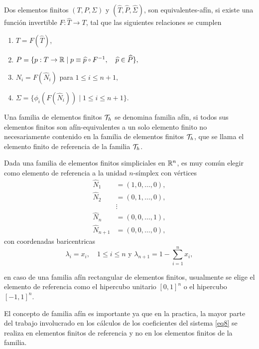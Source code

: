 \begin{definicion}
Dos elementos finitos $(T,P,\Sigma)$ y $(\widehat{T},\widehat{P},\widehat{\Sigma})$, son equivalentes-af\'in, si existe una funci\'on invertible $F\colon \widehat{T} \to T$, tal que las siguientes relaciones se cumplen 
\begin{enumerate}[{\rm (i)}]
	\item $T=F(\widehat{T})$,
	\item $P = \{ p:T\to \R  \mid p\equiv\widehat{p}\comp F^{-1},\quad  \widehat{p}\in \widehat{P} \},$
	\item $N_{i}=F(\widehat{N}_{i})$ para $1 \leq i\leq n+1,$
	\item $\Sigma = \{ \phi_{i}(F(\widehat{N}_{i})) \mid 1\leq i\leq n+1 \}. $
\end{enumerate}
\end{definicion}
Una familia de elementos finitos ${\mathcal{T}}_{h}$ se denomina familia af\'in, si todos sus elementos finitos son af\'in-equivalentes a un solo elemento finito no necesariamente contenido en la familia de elementos finitos ${\mathcal{T}}_{h}$, que se llama el elemento finito de referencia de la familia ${\mathcal{T}}_{h}$.

\begin{ejemplo}
Dada una familia de elementos finitos simpliciales en ${\mathbb{R}}^{n}$, es muy com\'un elegir como elemento de referencia a la unidad $n$-s\'implex con v\'ertices 
\begin{equation*}
\begin{split}
\widehat{N}_{1}& = (1,0,\ldots,0),\\
\widehat{N}_{2}& = (0,1,\ldots,0),\\
& \vdots \\
\widehat{N}_{n}& = (0,0,\ldots,1),\\
\widehat{N}_{n+1}& = (0,0,\ldots,0),
\end{split}
\end{equation*}
con coordenadas baricentricas 
\[ \lambda_{i} = x_{i},\quad 1\leq i\leq n \text{ y } \lambda_{n+1}=1-\sum_{i=1}^{n}x_{i}, \]

en caso de una familia af\'in rectangular de elementos finitos, usualmente se elige el elemento de referencia como el hipercubo unitario $[0,1]^{n}$ o el hipercubo $[-1,1]^{n}$.
\end{ejemplo}

El concepto de familia af\'in es importante ya que en la practica, la mayor parte del trabajo involucrado en los c\'alculos de los coeficientes del sistema \eqref{eq8} se realiza en elementos finitos de referencia y no en los elementos finitos de la familia. 

